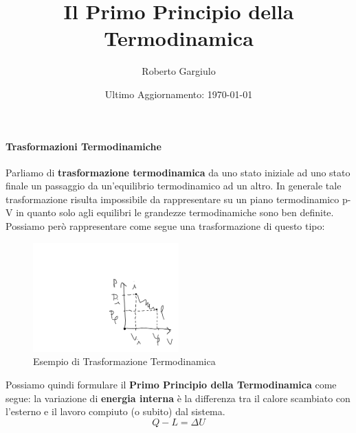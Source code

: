 \documentclass{article}
\title{Il Primo Principio della Termodinamica}
\author{Roberto Gargiulo}
\date{Ultimo Aggiornamento: \today}
\begin{document}
\maketitle
\tableofcontents

\paragraph{Trasformazioni Termodinamiche}
Parliamo di \textbf{trasformazione termodinamica} da uno stato iniziale ad uno stato finale un passaggio da un'equilibrio termodinamico ad un altro. In generale tale trasformazione risulta impossibile da rappresentare su un piano termodinamico p-V in quanto solo agli equilibri le grandezze termodinamiche sono ben definite. Possiamo però rappresentare come segue una trasformazione di questo tipo:
\begin{figure}[H]
    \centering
    \includegraphics[width=0.5\textwidth]{TrasformazioneIrreversibile.png}
    \caption{Esempio di Trasformazione Termodinamica}
    \label{TrasfIrrev}
\end{figure}

Possiamo quindi formulare il \textbf{Primo Principio della Termodinamica} come segue: la variazione di \textbf{energia interna} è la differenza tra il calore scambiato con l'esterno e il lavoro compiuto (o subito) dal sistema.
\begin{equation}
    \boxed{Q-L=\Delta U}
\end{equation}
\end{document}
